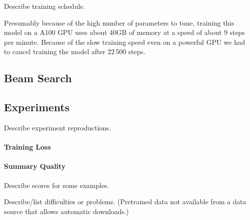 Describe training schedule.

Presumably because of the high number of parameters to tune, training this \BertSumAbs model on a A100 GPU uses about 40GB of memory at a speed of about 9 steps per minute.
Because of the slow training speed even on a powerful GPU we had to cancel training the model after 22\,500 steps.

\subsection{Beam Search}

\subsection{Experiments}

Describe experiment reproductions.

\paragraph{Training Loss}




\paragraph{Summary Quality}

Describe \Rouge scores for some examples.

Describe/list difficulties or problems. (Pretrained data not available from a data source that allows automatic downloads.)

